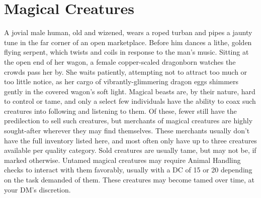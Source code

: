 \documentclass[10pt,a4paper,twoside,twocolumn,openany,nodeprecatedcode,bg=print]{dndbook}
\begin{document}
\section{Magical Creatures}
A jovial male human, old and wizened, wears a roped turban and pipes a jaunty tune in the far corner of an open marketplace. Before him dances a lithe, golden flying serpent, which twists and coils in response to the man's music.
Sitting at the open end of her wagon, a female copper-scaled dragonborn watches the crowds pass her by. She waits patiently, attempting not to attract too much or too little notice, as her cargo of vibrantly-glimmering dragon eggs shimmers gently in the covered wagon's soft light.
Magical beasts are, by their nature, hard to control or tame, and only a select few individuals have the ability to coax such creatures into following and listening to them. Of these, fewer still have the predilection to sell such creatures, but merchants of magical creatures are highly sought-after wherever they may find themselves. These merchants usually don't have the full inventory listed here, and most often only have up to three creatures available per quality category.
Sold creatures are usually tame, but may not be, if marked otherwise. Untamed magical creatures may require Animal Handling checks to interact with them favorably, usually with a DC of 15 or 20 depending on the task demanded of them. These creatures may become tamed over time, at your DM's discretion.
\end{document}
